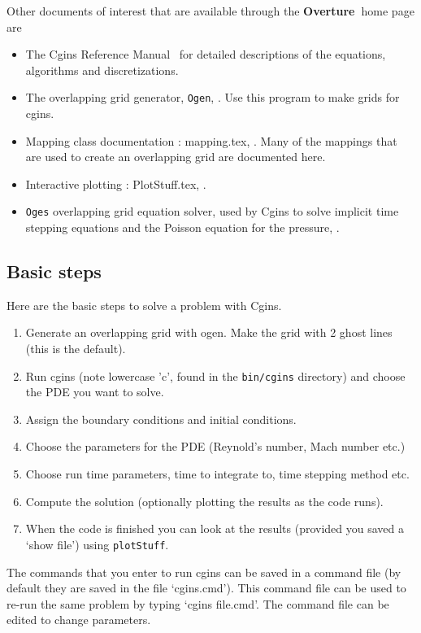 \documentclass{article}
\newcommand{\Index}[1]{#1\index{#1}}
\newcommand{\Overture}{{\bf Overture\ }}
\begin{document}
\noindent
Other documents of interest that are available through the \Overture home page are
\begin{itemize}
\item The Cgins Reference Manual~\cite{CginsReferenceManual} for detailed descriptions of the
      equations, algorithms and discretizations.
\item The overlapping grid generator, {\tt Ogen}, \cite{OGEN}. Use this program to make grids for cgins.
\item Mapping class documentation : {\ff mapping.tex}, \cite{MAPPINGS}. Many of the mappings that
   are used to create an overlapping grid are documented here. 
\item Interactive plotting : {\ff PlotStuff.tex}, \cite{PLOTSTUFF}.
\item {\tt Oges} overlapping grid equation solver, used by Cgins to solve implicit time stepping
    equations and the Poisson equation for the pressure, \cite{OGES}.
\end{itemize}


\subsection{Basic steps}
Here are the basic steps to solve a problem with Cgins.
\begin{enumerate}
  \item Generate an overlapping grid with ogen. Make the grid with 2 ghost lines (this is the default).
  \item Run cgins (note lowercase 'c', found in the {\tt bin/cgins} directory) 
        and choose the PDE you want to solve.
  \item Assign the boundary conditions and initial conditions.
  \item Choose the parameters for the PDE (Reynold's number, Mach number etc.)
  \item Choose run time parameters, time to integrate to, time stepping method etc.
  \item Compute the solution (optionally plotting the results as the code runs).
  \item When the code is finished you can look at the results (provided you saved a
     `show file') using {\tt plotStuff}.
\end{enumerate}
The commands that you enter to run cgins can be saved in a \Index{command file} (by default
they are saved in the file `cgins.cmd'). This command file can be used to re-run
the same problem by typing `cgins file.cmd'. The command file can be edited to change parameters.
\end{document}
